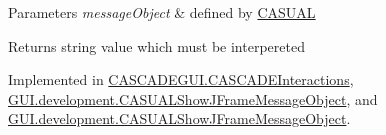 \begin{DoxyParams}{Parameters}
{\em message\-Object} & defined by \hyperlink{namespaceCASUAL}{C\-A\-S\-U\-A\-L} \\
\hline
\end{DoxyParams}
\begin{DoxyReturn}{Returns}
string value which must be interpereted 
\end{DoxyReturn}


Implemented in \hyperlink{classCASCADEGUI_1_1CASCADEInteractions_a4a7a501373e72563b00ba7ef6b4b6ecb}{C\-A\-S\-C\-A\-D\-E\-G\-U\-I.\-C\-A\-S\-C\-A\-D\-E\-Interactions}, \hyperlink{classGUI_1_1development_1_1CASUALShowJFrameMessageObject_a2ea27451cd76c3c64404413fca107310}{G\-U\-I.\-development.\-C\-A\-S\-U\-A\-L\-Show\-J\-Frame\-Message\-Object}, and \hyperlink{classGUI_1_1development_1_1CASUALShowJFrameMessageObject_a2ea27451cd76c3c64404413fca107310}{G\-U\-I.\-development.\-C\-A\-S\-U\-A\-L\-Show\-J\-Frame\-Message\-Object}.




